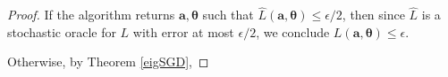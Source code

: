 \begin{proof}
If the algorithm returns $\boldsymbol{a,\theta}$ such that $\widehat{L}(\boldsymbol{a,\theta}) \leq \epsilon/2$, then since $\widehat{L}$ is a stochastic oracle for $L$ with error at most $\epsilon/2$, we conclude $L(\boldsymbol{a,\theta}) \leq \epsilon$. 

Otherwise, by Theorem \ref{eigSGD}, 
\end{proof}











